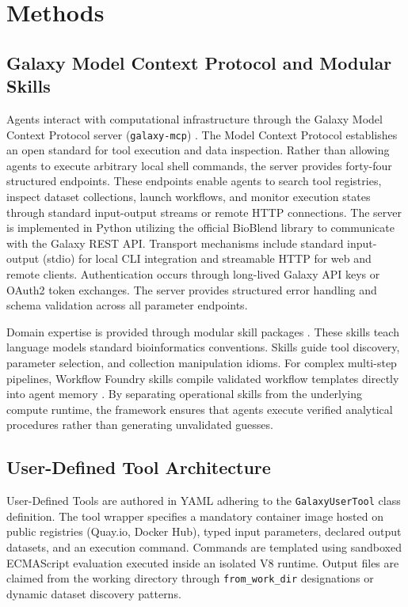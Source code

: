 \documentclass[11pt,letterpaper]{article}
\begin{document}
\section*{Methods}

\subsection*{Galaxy Model Context Protocol and Modular Skills}
Agents interact with computational infrastructure through the Galaxy Model Context Protocol server (\texttt{galaxy-mcp}) \cite{galaxymcp2026}. The Model Context Protocol establishes an open standard for tool execution and data inspection. Rather than allowing agents to execute arbitrary local shell commands, the server provides forty-four structured endpoints. These endpoints enable agents to search tool registries, inspect dataset collections, launch workflows, and monitor execution states through standard input-output streams or remote HTTP connections. The server is implemented in Python utilizing the official BioBlend library to communicate with the Galaxy REST API. Transport mechanisms include standard input-output (stdio) for local CLI integration and streamable HTTP for web and remote clients. Authentication occurs through long-lived Galaxy API keys or OAuth2 token exchanges. The server provides structured error handling and schema validation across all parameter endpoints.

Domain expertise is provided through modular skill packages \cite{galaxyskills2026}. These skills teach language models standard bioinformatics conventions. Skills guide tool discovery, parameter selection, and collection manipulation idioms. For complex multi-step pipelines, Workflow Foundry skills compile validated workflow templates directly into agent memory \cite{foundry2026}. By separating operational skills from the underlying compute runtime, the framework ensures that agents execute verified analytical procedures rather than generating unvalidated guesses.

\subsection*{User-Defined Tool Architecture}
User-Defined Tools are authored in YAML adhering to the \texttt{GalaxyUserTool} class definition. The tool wrapper specifies a mandatory container image hosted on public registries (Quay.io, Docker Hub), typed input parameters, declared output datasets, and an execution command. Commands are templated using sandboxed ECMAScript evaluation executed inside an isolated V8 runtime. Output files are claimed from the working directory through \texttt{from\_work\_dir} designations or dynamic dataset discovery patterns.
\end{document}
